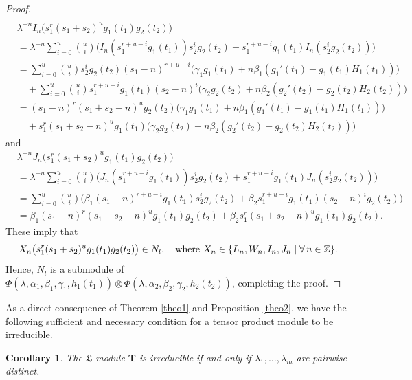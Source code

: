 \documentclass[12pt,leqno,amscd,amsfonts,amssymb]{amsart}
\def\a{\alpha}
\def\b{\beta}
\def\r{\gamma}
\def\Z{\mathbb{Z}}
\numberwithin{equation}{section}
\newtheorem{coro}[theo]{Corollary}
\begin{document}
\begin{proof}
\begin{align*}
\end{align*}
\begin{align*}
&\lambda^{-n} I_n\big( s_1^r (s_1 + s_2)^u g_1(t_1) g_2(t_2) \big)\\
&= \lambda^{-n} \sum_{i=0}^u \binom{u}{i} \Big( I_n(s_1^{r+u-i} g_1(t_1)) s_2^i g_2(t_2)+ s_1^{r+u-i} g_1(t_1) I_n(s_2^i g_2(t_2)) \Big)\\
&=\sum_{i=0}^u \binom{u}{i}s_2^i g_2(t_2)(s_1-n)^{r+u-i}\big(\r_1g_1(t_1)+n\b_1(g_1'(t_1)-g_1(t_1)H_1(t_1))\big)\\
&\quad +\sum_{i=0}^u \binom{u}{i}s_1^{r+u-i}g_1(t_1)(s_2-n)^{i}\big(\r_2g_2(t_2)+n\b_2(g_2'(t_2)-g_2(t_2)H_2(t_2))\big)\\
&=(s_1 - n)^r(s_1 + s_2 - n)^u g_2(t_2)\big(\r_1g_1(t_1)+n\b_1(g_1'(t_1)-g_1(t_1)H_1(t_1))\big)\\
&\quad + s_1^r(s_1 + s_2 - n)^ug_1(t_1)\big(\r_2g_2(t_2)+n\b_2(g_2'(t_2)-g_2(t_2)H_2(t_2))\big) 
\end{align*}
and
\begin{align*}
&\lambda^{-n} J_n\big( s_1^r (s_1 + s_2)^u g_1(t_1) g_2(t_2) \big)\\
&= \lambda^{-n} \sum_{i=0}^u \binom{u}{i} \Big( J_n(s_1^{r+u-i} g_1(t_1)) s_2^i g_2(t_2) + s_1^{r+u-i} g_1(t_1) J_n(s_2^i g_2(t_2)) \Big)\\
&=\sum_{i=0}^u \binom{u}{i}\big(\b_1(s_1-n)^{r+u-i}g_1(t_1) s_2^i g_2(t_2)+\b_2s_1^{r+u-i} g_1(t_1)(s_2-n)^i g_2(t_2)\big)\\
&= \b_1(s_1 - n)^r (s_1 + s_2 - n)^u  g_1(t_1) g_2(t_2) + \b_2s_1^r (s_1 + s_2 - n)^u g_1(t_1) g_2(t_2).
\end{align*}
These imply that $$X_n\big(s_1^r(s_1+s_2)^ug_1(t_1)g_2(t_2)\big)\in N_l, \quad{\rm where}\,\,X_n\in\{L_n, W_n,I_n,J_n\mid\forall \,n\in\Z\}.$$
Hence, $N_l$ is a submodule of $\Phi(\lambda,\a_1,\b_1,\r_1,h_1(t_1))\otimes\Phi(\lambda,\a_2,\b_2,\r_2,h_2(t_2))$, completing the proof.
	\end{proof}
As a direct consequence of Theorem \ref{theo1} and Proposition \ref{theo2}, we have the following sufficient and necessary condition for a tensor product module to be irreducible.
\begin{coro}\label{theo3}
The $\mathfrak L$-module  $\bm{T}$ is irreducible if and only if $\lambda_1, \ldots, \lambda_m$ are pairwise distinct.
\end{coro}	
\end{document}
